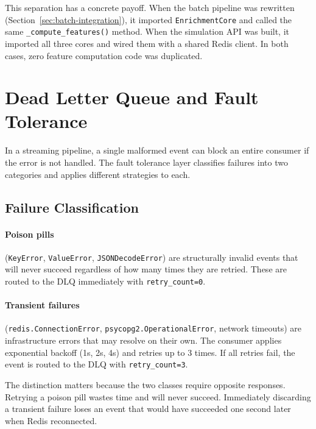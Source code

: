This separation has a concrete payoff. When the batch pipeline was rewritten
(Section~\ref{sec:batch-integration}), it imported \texttt{EnrichmentCore}
and called the same \texttt{\_compute\_features()} method. When the simulation
API was built, it imported all three cores and wired them with a shared Redis
client. In both cases, zero feature computation code was duplicated.

\section{Dead Letter Queue and Fault Tolerance}
\label{sec:dlq}

In a streaming pipeline, a single malformed event can block an entire consumer
if the error is not handled. The fault tolerance layer classifies failures into
two categories and applies different strategies to each.

\subsection{Failure Classification}

\paragraph{Poison pills} (\texttt{KeyError}, \texttt{ValueError},
\texttt{JSONDecodeError}) are structurally invalid events that will never
succeed regardless of how many times they are retried. These are routed to
the DLQ immediately with \texttt{retry\_count=0}.

\paragraph{Transient failures} (\texttt{redis.ConnectionError},
\texttt{psycopg2.OperationalError}, network timeouts) are infrastructure
errors that may resolve on their own. The consumer applies exponential
backoff (1s, 2s, 4s) and retries up to 3 times. If all retries fail, the
event is routed to the DLQ with \texttt{retry\_count=3}.

The distinction matters because the two classes require opposite responses.
Retrying a poison pill wastes time and will never succeed. Immediately
discarding a transient failure loses an event that would have succeeded one
second later when Redis reconnected.

